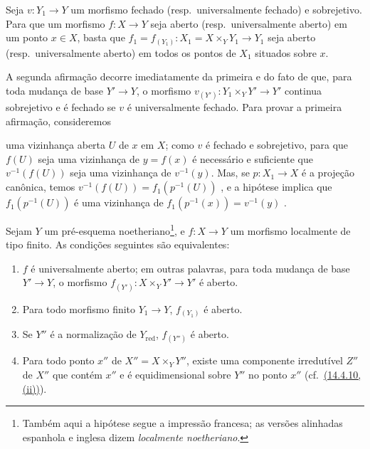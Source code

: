 \begin{lemma}[14.4.8.1]
\label{IV.14.4.8.1}
Seja $v:Y_1\to Y$ um morfismo fechado (resp.\ universalmente fechado) e sobrejetivo.
Para que um morfismo $f:X\to Y$ seja aberto (resp.\ universalmente aberto) em um ponto $x\in X$, basta que $f_1=f_{(Y_1)}:X_1=X\times_Y Y_1\to Y_1$ seja aberto (resp.\ universalmente aberto) em todos os pontos de $X_1$ situados sobre $x$.
\end{lemma}

A segunda afirmação decorre imediatamente da primeira e do fato de que, para toda mudança de base $Y'\to Y$, o morfismo $v_{(Y')}:Y_1\times_Y Y'\to Y'$ continua sobrejetivo e é fechado se $v$ é universalmente fechado.
Para provar a primeira afirmação, consideremos


uma vizinhança aberta $U$ de $x$ em $X$; como $v$ é fechado e sobrejetivo, para que $f(U)$ seja uma vizinhança de $y=f(x)$ é necessário e suficiente que $v^{-1}(f(U))$ seja uma vizinhança de $v^{-1}(y)$.
Mas, se $p:X_1\to X$ é a projeção canônica, temos $v^{-1}(f(U))=f_1(p^{-1}(U))$ , e a hipótese implica que $f_1(p^{-1}(U))$ é uma vizinhança de $f_1(p^{-1}(x))=v^{-1}(y)$ .

\begin{corollary}[14.4.9]
\label{IV.14.4.9}
Sejam $Y$ um pré-esquema noetheriano\footnote{Também aqui a hipótese segue a impressão francesa; as versões alinhadas espanhola e inglesa dizem \emph{localmente noetheriano}.}, e $f:X\to Y$ um morfismo localmente de tipo finito.
As condições seguintes são equivalentes:
\begin{enumerate}[label=\emph{\alph*)}]
  \item $f$ é universalmente aberto; em outras palavras, para toda mudança de base $Y'\to Y$, o morfismo $f_{(Y')}:X\times_Y Y'\to Y'$ é aberto.
  \item[\emph{a$'$)}] Para todo morfismo finito $Y_1\to Y$, $f_{(Y_1)}$ é aberto.
  \item[\emph{a$''$)}] Se $Y''$ é a normalização de $Y_{\mathrm{red}}$, $f_{(Y'')}$ é aberto.
  \item Para todo ponto $x''$ de $X''=X\times_Y Y''$, existe uma componente irredutível $Z''$ de $X''$ que contém $x''$ e é equidimensional sobre $Y''$ no ponto $x''$ (cf.\ {\hyperlink{ega4.c04.item.14-4-10}{(14.4.10, (ii))}}).
\end{enumerate}
\end{corollary}


